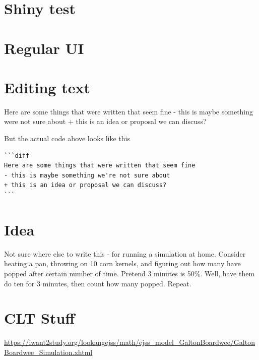 \documentclass[
]{book}
\newenvironment{Shaded}{\begin{snugshade}}{\end{snugshade}}
\newcommand{\NormalTok}[1]{#1}
\newcommand{\StringTok}[1]{\textcolor[rgb]{0.31,0.60,0.02}{#1}}
\newcommand{\VariableTok}[1]{\textcolor[rgb]{0.00,0.00,0.00}{#1}}
\theoremstyle{definition}
\theoremstyle{definition}
\theoremstyle{definition}
\theoremstyle{remark}
\begin{document}
\hypertarget{shiny-test}{%
\section{Shiny test}\label{shiny-test}}

\hypertarget{regular-ui}{%
\section{Regular UI}\label{regular-ui}}

\hypertarget{editing-text}{%
\section{Editing text}\label{editing-text}}

\begin{Shaded}
\begin{Highlighting}[]
\NormalTok{Here are some things that were written that seem fine}
\StringTok{{-} this is maybe something we\textquotesingle{}re not sure about}
\VariableTok{+ this is an idea or proposal we can discuss?}
\end{Highlighting}
\end{Shaded}

But the actual code above looks like this

\begin{verbatim}
```diff
Here are some things that were written that seem fine
- this is maybe something we're not sure about
+ this is an idea or proposal we can discuss?
```
\end{verbatim}

\hypertarget{idea}{%
\section{Idea}\label{idea}}

Not sure where else to write this - for running a simulation at home. Consider heating a pan, throwing on 10 corn kernels, and figuring out how many have popped after certain number of time. Pretend 3 minutes is 50\%. Well, have them do ten for 3 minutes, then count how many popped. Repeat.

\hypertarget{clt-stuff}{%
\section{CLT Stuff}\label{clt-stuff}}

\url{https://iwant2study.org/lookangejss/math/ejss_model_GaltonBoardwee/GaltonBoardwee_Simulation.xhtml}
\end{document}

